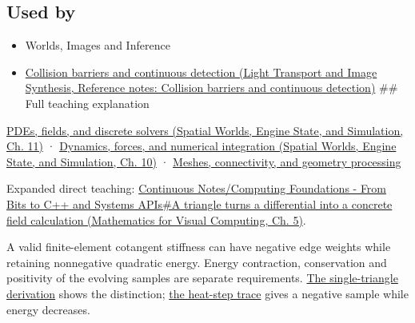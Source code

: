 \subsection{Used by}\label{appendix-1988d465c119-used-by}

\begin{itemize}
\item
  {Worlds, Images and Inference}
\item
  \href{../04-Light-Transport-and-Image-Synthesis/main.pdf\#nameddest=appendix-a9ba01fa72a6}{Collision barriers and continuous detection (Light Transport and Image Synthesis, Reference notes: Collision barriers and continuous detection)} \#\# Full teaching explanation
\end{itemize}

\href{../05-Spatial-Worlds-Engine-State-and-Simulation/main.pdf\#nameddest=04-visual-computing-ii-ch030-pdes-fields-and-discrete-solvers}{PDEs, fields, and discrete solvers (Spatial Worlds, Engine State, and Simulation, Ch. 11)} · \href{../05-Spatial-Worlds-Engine-State-and-Simulation/main.pdf\#nameddest=04-visual-computing-ii-ch029-dynamics-forces-and-numerical-integration}{Dynamics, forces, and numerical integration (Spatial Worlds, Engine State, and Simulation, Ch. 10)} · \hyperref[03-visual-computing-i-ch002-meshes-connectivity-and-geometry-processing]{Meshes, connectivity, and geometry processing}

Expanded direct teaching: \href{../02-Mathematics-for-Visual-Computing/main.pdf\#nameddest=02-foundations-ii-ch021-a-triangle-turns-a-differential-into-a-concrete-field-calculation}{Continuous Notes/Computing Foundations - From Bits to C++ and Systems APIs\#A triangle turns a differential into a concrete field calculation (Mathematics for Visual Computing, Ch. 5)}.

A valid finite-element cotangent stiffness can have negative edge weights while retaining nonnegative quadratic energy. Energy contraction, conservation and positivity of the evolving samples are separate requirements. \hyperref[03-visual-computing-i-ch002-nonnegative-energy-and-nonnegative-weights-are-different-promises]{The single-triangle derivation} shows the distinction; \hyperref[03-visual-computing-i-ch002-a-stable-heat-step-can-still-create-a-negative-sample]{the heat-step trace} gives a negative sample while energy decreases.
